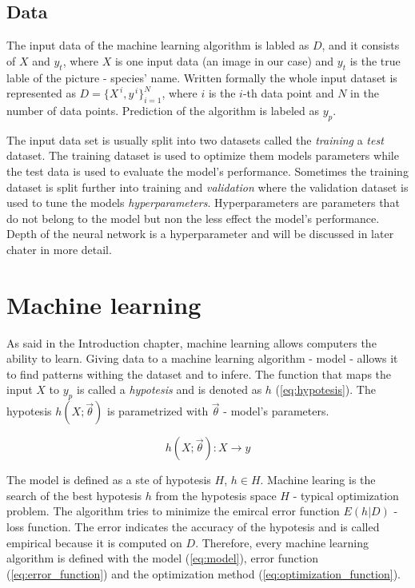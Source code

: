 \documentclass[times, utf8, diplomski]{fer}
\begin{document}
\subsection{Data}
The input data of the machine learning algorithm is labled as $D$, and it consists of $X$ and $y_{t}$, where $X$ is one input data (an image in our case) and $y_{t}$ is the true lable of the picture - species' name. Written formally the whole input dataset is represented as $D = \{{X}^{\,i},y^{\,i}\}^{N}_{i=1}$, where $i$ is the $i$-th data point and $N$ in the number of data points. Prediction of the algorithm is labeled as $y_{p}$.

The input data set is usually split into two datasets called the \textit{training} a \textit{test} dataset. The training dataset is used to optimize them models parameters while the test data is used to evaluate the model's performance. Sometimes the training dataset is split further into training and \textit{validation} where the validation dataset is used to tune the models \textit{hyperparameters}. Hyperparameters are parameters that do not belong to the model but non the less effect the model's performance. Depth of the neural network is a hyperparameter and will be discussed in later chater in more detail.


\section{Machine learning}
As said in the Introduction chapter, machine learning allows computers the ability to learn. Giving data to a machine learning algorithm - model - allows it to find patterns withing the dataset and to infere. The function that maps the input $X$ to $y_p$ is called a \textit{hypotesis} and is denoted as $h$ (\ref{eq:hypotesis}). The hypotesis $h(X ; \vec{\theta})$ is parametrized with $\vec{\theta}$ - model's parameters.

\begin{equation} \label{eq:hypotesis}
	h(X ; \vec{\theta}) : X \to y
\end{equation}


The model is defined as a ste of hypotesis $H$, $h \in H$. Machine learing is the search of the best hypotesis $h$ from the hypotesis space $H$ - typical optimization problem. The algorithm tries to minimize the emircal error function $E(h|D)$ - loss function. The error indicates the accuracy of the hypotesis and is called empirical because it is computed on $D$. Therefore, every machine learning algorithm is defined with the model (\ref{eq:model}), error function (\ref{eq:error_function}) and the optimization method (\ref{eq:optimization_function}).
\end{document}
